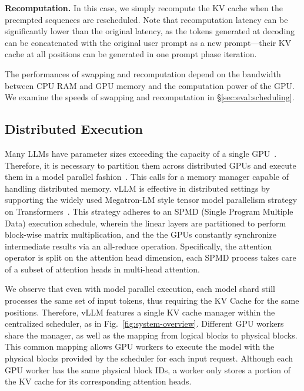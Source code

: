 \documentclass[sigplan,10pt]{acmart}
\newcommand{\sys}[0]{vLLM\xspace}
\newcommand{\heading}[1]{\vspace{4pt}\noindent\textbf{#1}}
\begin{document}
\heading{Recomputation.} In this case, we simply recompute the KV cache when the preempted sequences are rescheduled. Note that recomputation latency can be significantly lower than the original latency, as the tokens generated at decoding can be concatenated with the original user prompt as a new prompt---their KV cache at all positions can be generated in one prompt phase iteration.

The performances of swapping and recomputation depend on the bandwidth between CPU RAM and GPU memory and the computation power of the GPU. We examine the speeds of swapping and recomputation in \S\ref{sec:eval:scheduling}.

\subsection{Distributed Execution}
\label{sec:distributed}
Many LLMs have parameter sizes exceeding the capacity of a single GPU~\cite{brown2020language, chowdhery2022palm}. Therefore, it is necessary to partition them across distributed GPUs and execute them in a model parallel fashion~\cite{zheng2022alpa, li2023alpaserve}. This calls for a memory manager capable of handling distributed memory. \sys is effective in distributed settings by supporting the widely used Megatron-LM style tensor model parallelism strategy on Transformers~\cite{shoeybi2019megatron}. 
This strategy adheres to an SPMD (Single Program Multiple Data) execution schedule, wherein the linear layers are partitioned to perform block-wise matrix multiplication, and the the GPUs constantly synchronize intermediate results via an all-reduce operation. Specifically, the attention operator is split on the attention head dimension, each SPMD process takes care of a subset of attention heads in multi-head attention.

We observe that even with model parallel execution, each model shard still processes the same set of input tokens, thus requiring the KV Cache for the same positions. Therefore, \sys features a single KV cache manager within the centralized scheduler, as in Fig.~\ref{fig:system-overview}. Different GPU workers share the manager, as well as the mapping from logical blocks to physical blocks. 
This common mapping allows GPU workers to execute the model with the physical blocks provided by the scheduler for each input request.
Although each GPU worker has the same physical block IDs, a worker only stores a portion of the KV cache for its corresponding attention heads.
\end{document}
